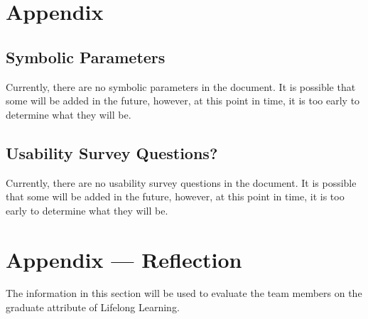 \documentclass[12pt, titlepage]{article}
\begin{document}


				




\newpage

\section{Appendix}


\subsection{Symbolic Parameters}

Currently, there are no symbolic parameters in the document. It is possible that some will be added in the future, however, 
at this point in time, it is too early to determine what they will be.

\subsection{Usability Survey Questions?}

Currently, there are no usability survey questions in the document. It is possible that some will be added in the future, however,
at this point in time, it is too early to determine what they will be.

\newpage{}
\section*{Appendix --- Reflection}


The information in this section will be used to evaluate the team members on the
graduate attribute of Lifelong Learning.


\end{document}

